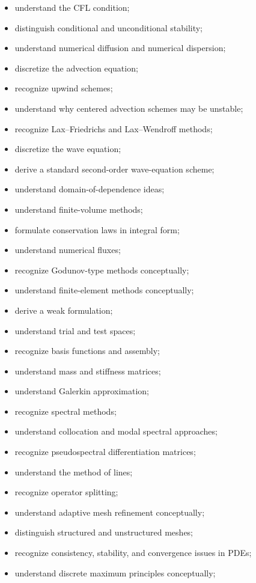 {\begin{itemize}
    \item understand the CFL condition;
    \item distinguish conditional and unconditional stability;
    \item understand numerical diffusion and numerical dispersion;
    \item discretize the advection equation;
    \item recognize upwind schemes;
    \item understand why centered advection schemes may be unstable;
    \item recognize Lax--Friedrichs and Lax--Wendroff methods;
    \item discretize the wave equation;
    \item derive a standard second-order wave-equation scheme;
    \item understand domain-of-dependence ideas;
    \item understand finite-volume methods;
    \item formulate conservation laws in integral form;
    \item understand numerical fluxes;
    \item recognize Godunov-type methods conceptually;
    \item understand finite-element methods conceptually;
    \item derive a weak formulation;
    \item understand trial and test spaces;
    \item recognize basis functions and assembly;
    \item understand mass and stiffness matrices;
    \item understand Galerkin approximation;
    \item recognize spectral methods;
    \item understand collocation and modal spectral approaches;
    \item recognize pseudospectral differentiation matrices;
    \item understand the method of lines;
    \item recognize operator splitting;
    \item understand adaptive mesh refinement conceptually;
    \item distinguish structured and unstructured meshes;
    \item recognize consistency, stability, and convergence issues in PDEs;
    \item understand discrete maximum principles conceptually;

\end{itemize}}
